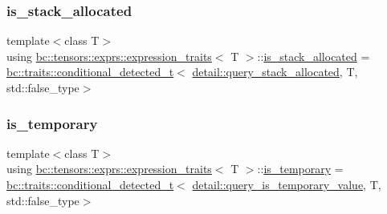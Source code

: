 \mbox{\label{structbc_1_1tensors_1_1exprs_1_1expression__traits_aab101a01178cf1ed824cb15709429055}} 
\subsubsection{\texorpdfstring{is\+\_\+stack\+\_\+allocated}{is\_stack\_allocated}}
{\footnotesize\ttfamily template$<$class T$>$ \\
using \hyperlink{structbc_1_1tensors_1_1exprs_1_1expression__traits}{bc\+::tensors\+::exprs\+::expression\+\_\+traits}$<$ T $>$\+::\hyperlink{structbc_1_1tensors_1_1exprs_1_1expression__traits_aab101a01178cf1ed824cb15709429055}{is\+\_\+stack\+\_\+allocated} =  \hyperlink{namespacebc_1_1traits_a1a6d378947ec32acd457890854bcd592}{bc\+::traits\+::conditional\+\_\+detected\+\_\+t}$<$ \hyperlink{namespacebc_1_1tensors_1_1exprs_1_1detail_a35543bad82197de0bb8d50c079e7cbaf}{detail\+::query\+\_\+stack\+\_\+allocated}, T, std\+::false\+\_\+type$>$}

\mbox{\label{structbc_1_1tensors_1_1exprs_1_1expression__traits_ab5b69e55697b1e78cf9272ac1e9214a0}} 
\subsubsection{\texorpdfstring{is\+\_\+temporary}{is\_temporary}}
{\footnotesize\ttfamily template$<$class T$>$ \\
using \hyperlink{structbc_1_1tensors_1_1exprs_1_1expression__traits}{bc\+::tensors\+::exprs\+::expression\+\_\+traits}$<$ T $>$\+::\hyperlink{structbc_1_1tensors_1_1exprs_1_1expression__traits_ab5b69e55697b1e78cf9272ac1e9214a0}{is\+\_\+temporary} =  \hyperlink{namespacebc_1_1traits_a1a6d378947ec32acd457890854bcd592}{bc\+::traits\+::conditional\+\_\+detected\+\_\+t}$<$ \hyperlink{namespacebc_1_1tensors_1_1exprs_1_1detail_a78329f6a449e413ac38baeaf0574e64d}{detail\+::query\+\_\+is\+\_\+temporary\+\_\+value}, T, std\+::false\+\_\+type$>$}

